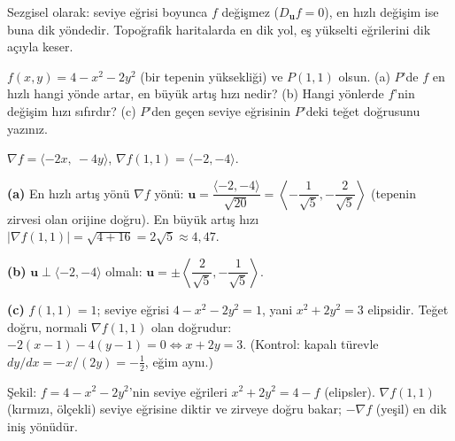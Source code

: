 Sezgisel olarak: seviye eğrisi boyunca $f$ değişmez ($D_{\mathbf u}f=0$), en hızlı değişim ise buna dik yöndedir.
Topoğrafik haritalarda en dik yol, eş yükselti eğrilerini dik açıyla keser.

\begin{soru}
$f(x,y)=4-x^2-2y^2$ (bir tepenin yüksekliği) ve $P(1,1)$ olsun.
(a) $P$'de $f$ en hızlı hangi yönde artar, en büyük artış hızı nedir?
(b) Hangi yönlerde $f$'nin değişim hızı sıfırdır?
(c) $P$'den geçen seviye eğrisinin $P$'deki teğet doğrusunu yazınız.
\end{soru}
\begin{cevap}
$\nabla f=\langle-2x,\ -4y\rangle$, $\nabla f(1,1)=\langle-2,-4\rangle$.

\textbf{(a)} En hızlı artış yönü $\nabla f$ yönü: $\mathbf u=\dfrac{\langle-2,-4\rangle}{\sqrt{20}}=\left\langle-\dfrac{1}{\sqrt5},-\dfrac{2}{\sqrt5}\right\rangle$
(tepenin zirvesi olan orijine doğru). En büyük artış hızı $|\nabla f(1,1)|=\sqrt{4+16}=2\sqrt5\approx4{,}47$.

\textbf{(b)} $\mathbf u\perp\langle-2,-4\rangle$ olmalı: $\mathbf u=\pm\left\langle\dfrac{2}{\sqrt5},-\dfrac{1}{\sqrt5}\right\rangle$.

\textbf{(c)} $f(1,1)=1$; seviye eğrisi $4-x^2-2y^2=1$, yani $x^2+2y^2=3$ elipsidir. Teğet doğru, normali $\nabla f(1,1)$ olan
doğrudur: $-2(x-1)-4(y-1)=0\iff x+2y=3$. (Kontrol: kapalı türevle $dy/dx=-x/(2y)=-\frac12$, eğim aynı.)
\end{cevap}

\begin{center}
\end{center}
{\small Şekil: $f=4-x^2-2y^2$'nin seviye eğrileri $x^2+2y^2=4-f$ (elipsler). $\nabla f(1,1)$ (kırmızı, ölçekli) seviye
eğrisine diktir ve zirveye doğru bakar; $-\nabla f$ (yeşil) en dik iniş yönüdür.}

